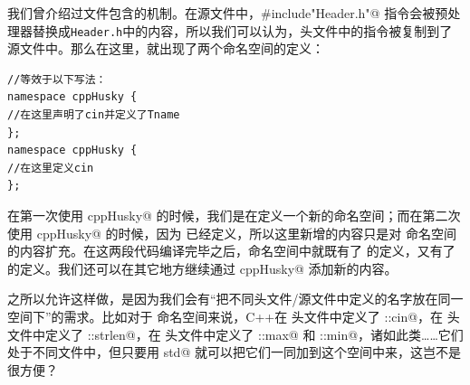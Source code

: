 我们曾介绍过文件包含的机制。在源文件中，\lstinline@#include"Header.h"@ 指令会被预处理器替换成\texttt{Header.h}中的内容，所以我们可以认为，头文件中的指令被复制到了源文件中。那么在这里，就出现了两个命名空间的定义：
\begin{lstlisting}
//等效于以下写法：
namespace cppHusky {
//在这里声明了cin并定义了Tname
};
namespace cppHusky {
//在这里定义cin
};
\end{lstlisting}
在第一次使用 \lstinline@namespace cppHusky@ 的时候，我们是在定义一个新的命名空间；而在第二次使用 \lstinline@namespace cppHusky@ 的时候，因为 \lstinline@cppHusky@ 已经定义，所以这里新增的内容只是对 \lstinline@cppHusky@ 命名空间的内容扩充。在这两段代码编译完毕之后，\lstinline@cppHusky@ 命名空间中就既有了 \lstinline@Tname@ 的定义，又有了 \lstinline@cin@ 的定义。我们还可以在其它地方继续通过 \lstinline@namespace cppHusky@ 添加新的内容。\par
之所以允许这样做，是因为我们会有``把不同头文件/源文件中定义的名字放在同一空间下''的需求。比如对于 \lstinline@std@ 命名空间来说，C++在 \lstinline@iostream@ 头文件中定义了 \lstinline@std::cin@，在 \lstinline@cstring@ 头文件中定义了 \lstinline@std::strlen@，在 \lstinline@algorithm@ 头文件中定义了 \lstinline@std::max@ 和 \lstinline@std::min@，诸如此类……它们处于不同文件中，但只要用 \lstinline@namespace std@ 就可以把它们一同加到这个空间中来，这岂不是很方便？\par
